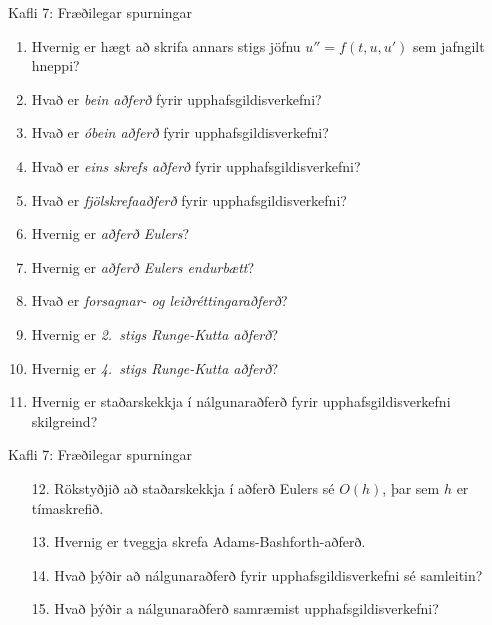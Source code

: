 \begin{frame}{Kafli 7: Fræðilegar spurningar}
  \begin{enumerate}
  \item Hvernig er hægt að skrifa annars stigs jöfnu
$u''=f(t,u,u')$ sem jafngilt hneppi?
  \item Hvað er {\it bein aðferð} fyrir upphafsgildisverkefni? 
  \item Hvað er {\it óbein aðferð} fyrir upphafsgildisverkefni? 
  \item Hvað er {\it eins skrefs aðferð} fyrir upphafsgildisverkefni? 
  \item Hvað er {\it fjölskrefaaðferð} fyrir upphafsgildisverkefni? 
  \item Hvernig er {\it aðferð Eulers}? 
  \item Hvernig er {\it aðferð Eulers endurbætt}?
  \item Hvað er {\it forsagnar- og leiðréttingaraðferð}?
  \item Hvernig er {\it 2.~stigs Runge-Kutta aðferð}?
  \item Hvernig er {\it 4.~stigs Runge-Kutta aðferð}?
  \item Hvernig er staðarskekkja í nálgunaraðferð fyrir
    upphafsgildisverkefni skilgreind?
  \end{enumerate}
\end{frame}


\begin{frame}{Kafli 7: Fræðilegar spurningar}
  \begin{enumerate}
  \item [12.]  Rökstyðjið að staðarskekkja í aðferð Eulers sé $O(h)$,
    þar sem $h$ er tímaskrefið.
  \item [13.] Hvernig er tveggja skrefa Adams-Bashforth-aðferð.
  \item [14.] Hvað þýðir að nálgunaraðferð fyrir upphafsgildisverkefni
    sé samleitin?
  \item [15.] Hvað þýðir a nálgunaraðferð samræmist upphafsgildisverkefni?
   \end{enumerate}
\end{frame}

